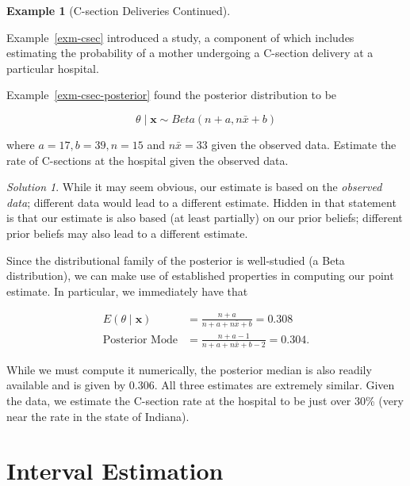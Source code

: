 \documentclass[
  letterpaper,
  DIV=11,
  numbers=noendperiod]{scrreprt}
\theoremstyle{definition}
\newtheorem{example}{Example}[chapter]
\theoremstyle{definition}
\theoremstyle{plain}
\theoremstyle{remark}
\newtheorem*{solution}{Solution}
\begin{document}
\begin{example}[C-section Deliveries
Continued]\protect\hypertarget{exm-csec-point-estimate}{}\label{exm-csec-point-estimate}

Example~\ref{exm-csec} introduced a study, a component of which includes
estimating the probability of a mother undergoing a C-section delivery
at a particular hospital.

Example~\ref{exm-csec-posterior} found the posterior distribution to be

\[\theta \mid \mathbf{x} \sim Beta\left(n + a, n\bar{x} + b\right)\]

where \(a = 17, b = 39, n = 15\) and \(n\bar{x} = 33\) given the
observed data. Estimate the rate of C-sections at the hospital given the
observed data.

\end{example}

\begin{solution}

While it may seem obvious, our estimate is based on the \emph{observed
data}; different data would lead to a different estimate. Hidden in that
statement is that our estimate is also based (at least partially) on our
prior beliefs; different prior beliefs may also lead to a different
estimate.

Since the distributional family of the posterior is well-studied (a Beta
distribution), we can make use of established properties in computing
our point estimate. In particular, we immediately have that

\[
\begin{aligned}
  E\left(\theta \mid \mathbf{x}\right)
    &= \frac{n + a}{n + a + n\bar{x} + b} = 0.308 \\
  \text{Posterior Mode} 
    &= \frac{n + a - 1}{n + a + n\bar{x} + b - 2} = 0.304.
\end{aligned}
\]

While we must compute it numerically, the posterior median is also
readily available and is given by 0.306. All three estimates are
extremely similar. Given the data, we estimate the C-section rate at the
hospital to be just over 30\% (very near the rate in the state of
Indiana).

\end{solution}

\hypertarget{sec-interval-estimation}{%
\chapter{Interval Estimation}\label{sec-interval-estimation}}
\end{document}
